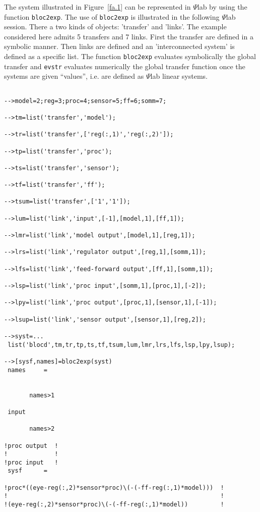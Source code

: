 	The system illustrated in Figure~\ref{fa.1} can
be represented in $\Psi$lab by using the function {\tt bloc2exp}.
The use of {\tt bloc2exp} is illustrated in the following $\Psi$lab
session.
There a two kinds of objects: 'transfer' and 'links'. The example
considered here admits 5 transfers and 7 links.
First the transfer are defined in a symbolic manner. Then links
are defined and an 'interconnected system' is defined as
a specific list. The function {\tt bloc2exp} evaluates symbolically
the global transfer and {\tt evstr} evaluates numerically
the global transfer function once the systems are given ``values'', i.e.
are defined as $\Psi$lab linear systems.
%
\begin{verbatim}
 
-->model=2;reg=3;proc=4;sensor=5;ff=6;somm=7;
 
-->tm=list('transfer','model');
 
-->tr=list('transfer',['reg(:,1)','reg(:,2)']);
 
-->tp=list('transfer','proc');
 
-->ts=list('transfer','sensor');
 
-->tf=list('transfer','ff');
 
-->tsum=list('transfer',['1','1']);
 
-->lum=list('link','input',[-1],[model,1],[ff,1]);
 
-->lmr=list('link','model output',[model,1],[reg,1]);
 
-->lrs=list('link','regulator output',[reg,1],[somm,1]);
 
-->lfs=list('link','feed-forward output',[ff,1],[somm,1]);
 
-->lsp=list('link','proc input',[somm,1],[proc,1],[-2]);
 
-->lpy=list('link','proc output',[proc,1],[sensor,1],[-1]);
 
-->lsup=list('link','sensor output',[sensor,1],[reg,2]);
 
-->syst=...
 list('blocd',tm,tr,tp,ts,tf,tsum,lum,lmr,lrs,lfs,lsp,lpy,lsup);
 
-->[sysf,names]=bloc2exp(syst)
 names     =
 
 
       names>1
 
 input   
 
       names>2
 
!proc output  !
!             !
!proc input   !
 sysf      =
 
!proc*((eye-reg(:,2)*sensor*proc)\(-(-ff-reg(:,1)*model)))  !
!                                                           !
!(eye-reg(:,2)*sensor*proc)\(-(-ff-reg(:,1)*model))         !
\end{verbatim}
